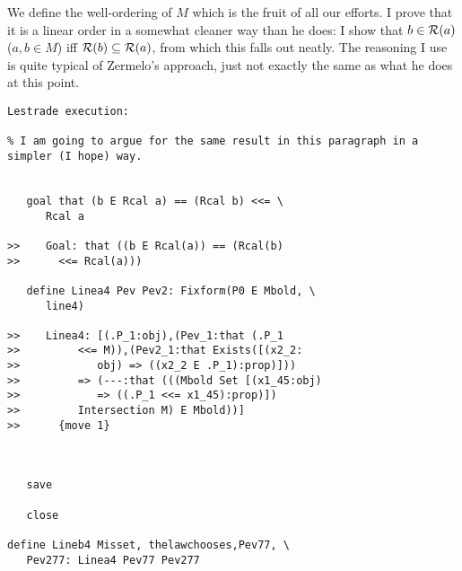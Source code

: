 \documentclass[12pt]{article}
\begin{document}
We define the well-ordering of $M$ which is the fruit of all our efforts.  I prove that it is a linear order in a somewhat cleaner way than he does:
I show that $b \in {\cal R}(a)$ ($a,b \in M$) iff ${\cal R}(b) \subseteq {\cal R}(a)$, from which this falls out neatly.  The reasoning I use is quite typical of Zermelo's approach, just not exactly the same as what he does at this point.

\begin{verbatim}Lestrade execution:

% I am going to argue for the same result in this paragraph in a simpler (I hope) way.


   goal that (b E Rcal a) == (Rcal b) <<= \
      Rcal a

>>    Goal: that ((b E Rcal(a)) == (Rcal(b)
>>      <<= Rcal(a)))

   define Linea4 Pev Pev2: Fixform(P0 E Mbold, \
      line4)

>>    Linea4: [(.P_1:obj),(Pev_1:that (.P_1
>>         <<= M)),(Pev2_1:that Exists([(x2_2:
>>            obj) => ((x2_2 E .P_1):prop)]))
>>         => (---:that (((Mbold Set [(x1_45:obj)
>>            => ((.P_1 <<= x1_45):prop)])
>>         Intersection M) E Mbold))]
>>      {move 1}



   save

   close

define Lineb4 Misset, thelawchooses,Pev77, \
   Pev277: Linea4 Pev77 Pev277


\end{verbatim}
\end{document}
